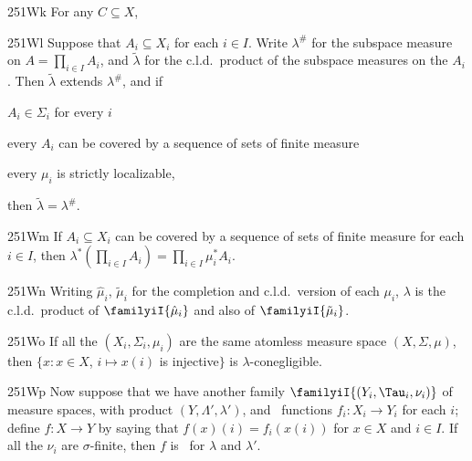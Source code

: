 \spheader 251Wk For any $C\subseteq X$,


\spheader 251Wl Suppose that $A_i\subseteq X_i$ for each $i\in I$.
Write $\lambda^{\#}$ for the subspace measure on $A=\prod_{i\in I}A_i$,
and $\tilde\lambda$ for the c.l.d.\ product of the subspace measures on
the $A_i$.   Then $\tilde\lambda$ extends $\lambda^{\#}$, and if

 $A_i\in\Sigma_i$ for every $i$

 every $A_i$ can be covered by a sequence of sets of finite
measure

 every $\mu_i$ is strictly localizable,

\noindent then $\tilde\lambda=\lambda^{\#}$.

\spheader 251Wm If $A_i\subseteq X_i$ can be covered by a sequence of
sets of finite measure for each $i\in I$, then
$\lambda^*(\prod_{i\in I}A_i)=\prod_{i\in I}\mu_i^*A_i$.

\spheader 251Wn Writing $\hat\mu_i$, $\tilde\mu_i$ for the completion
and c.l.d.\ version of each $\mu_i$, $\lambda$ is the c.l.d.\ product of
$\familyiI{\hat\mu_i}$ and also of $\familyiI{\tilde\mu_i}$.

\spheader 251Wo If all the $(X_i,\Sigma_i,\mu_i)$ are the same atomless
measure space $(X,\Sigma,\mu)$, then
$\{x:x\in X$, $i\mapsto x(i)$ is injective$\}$ is
$\lambda$-conegligible.

\spheader 251Wp Now suppose that we have another family
$\familyiI{(Y_i,\Tau_i,\nu_i)}$ of measure spaces, with product
$(Y,\Lambda',\lambda')$, and \imp\ functions $f_i:X_i\to Y_i$ for each $i$;
define $f:X\to Y$ by saying that $f(x)(i)=f_i(x(i))$ for $x\in X$ and
$i\in I$.   If all the $\nu_i$ are $\sigma$-finite, then $f$ is \imp\ for
$\lambda$ and $\lambda'$.

